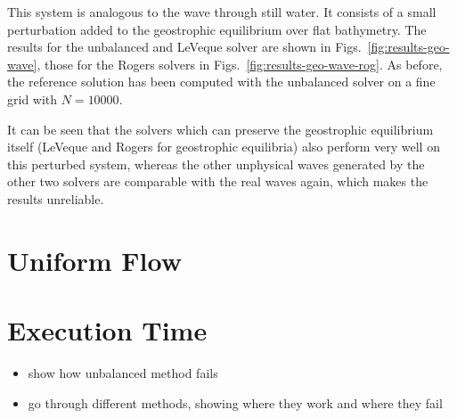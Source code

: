 This system is analogous to the wave through still water. It consists of a small perturbation added to the geostrophic equilibrium over flat bathymetry. The results for the unbalanced and LeVeque solver are shown in Figs.~\ref{fig:results-geo-wave}, those for the Rogers solvers in Figs.~\ref{fig:results-geo-wave-rog}. As before, the reference solution has been computed with the unbalanced solver on a fine grid with $N = 10000$.

It can be seen that the solvers which can preserve the geostrophic equilibrium itself (LeVeque and Rogers for geostrophic equilibria) also perform very well on this perturbed system, whereas the other unphysical waves generated by the other two solvers are comparable with the real waves again, which makes the results unreliable.

\section{Uniform Flow}

\section{Execution Time}

\begin{itemize}
  \item show how unbalanced method fails
  \item go through different methods, showing where they work and where they fail
\end{itemize}